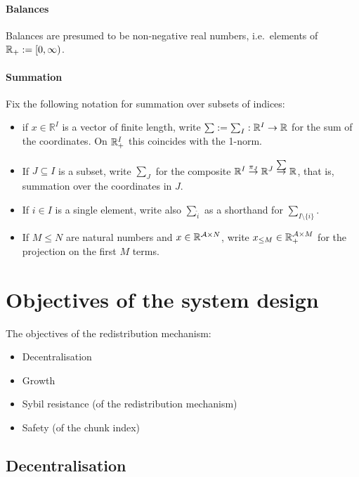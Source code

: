 \paragraph{Balances} Balances are presumed to be non-negative real numbers, i.e.~elements of $\mathbb{R}_+ := [0,\infty)$.

\paragraph{Summation}
Fix the following notation for summation over subsets of indices:
\begin{itemize}
  \item if $x\in \mathbb{R}^I$ is a vector of finite length, write $\sum:=\sum_I:\mathbb{R}^I\rightarrow\mathbb{R}$ for the sum of the coordinates. On $\mathbb{R}_+^I$ this coincides with the 1-norm.
  \item If $J\subseteq I$ is a subset, write $\sum_J$ for the composite $\mathbb{R}^I\stackrel{\pi_J}{\rightarrow}\mathbb{R}^J\stackrel{\sum}{\rightarrow}\mathbb{R}$, that is, summation over the coordinates in $J$.
  \item If $i\in I$ is a single element, write also $\sum_{\hat{i}}$ as a shorthand for $\sum_{I\setminus\{i\}}$.
  \item If $M\leq N$ are natural numbers and $x\in\mathbb{R}^{\mathcal{A}\times N}$, write $x_{\leq M}\in \mathbb{R}_+^{\mathcal{A}\times M}$ for the projection on the first $M$ terms.
\end{itemize}



\newpage

\section{Objectives of the system design}

The objectives of the redistribution mechanism:
\begin{itemize}
  \item Decentralisation
  \item Growth
  \item Sybil resistance (of the redistribution mechanism)
  \item Safety (of the chunk index)
\end{itemize}

\subsection{Decentralisation}

